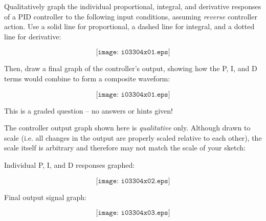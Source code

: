 

Qualitatively graph the individual proportional, integral, and derivative responses of a PID controller to the following input conditions, assuming {\it reverse} controller action.  Use a solid line for proportional, a dashed line for integral, and a dotted line for derivative:

$$\texttt{[image: i03304x01.eps]}$$

Then, draw a final graph of the controller's output, showing how the P, I, and D terms would combine to form a composite waveform:

$$\texttt{[image: i03304x01.eps]}$$

\vfil 

\eject






This is a graded question -- no answers or hints given!







The controller output graph shown here is {\it qualitative} only.  Although drawn to scale (i.e. all changes in the output are properly scaled relative to each other), the scale itself is arbitrary and therefore may not match the scale of your sketch:

\vskip 10pt

Individual P, I, and D responses graphed:

$$\texttt{[image: i03304x02.eps]}$$

Final output signal graph:

$$\texttt{[image: i03304x03.eps]}$$




